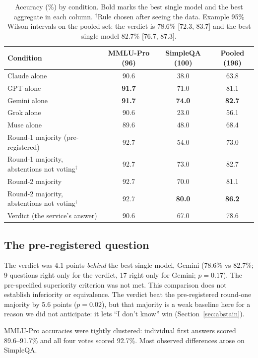 \documentclass[11pt]{article}
\begin{document}
\begin{table}[t]
\centering
\begin{tabular}{lccc}
\toprule
Condition & MMLU-Pro (96) & SimpleQA (100) & Pooled (196) \\
\midrule
Claude alone & 90.6 & 38.0 & 63.8 \\
GPT alone & \textbf{91.7} & 71.0 & 81.1 \\
Gemini alone & \textbf{91.7} & \textbf{74.0} & \textbf{82.7} \\
Grok alone & 90.6 & 23.0 & 56.1 \\
Muse alone & 89.6 & 48.0 & 68.4 \\
\midrule
Round-1 majority (pre-registered) & 92.7 & 54.0 & 73.0 \\
Round-1 majority, abstentions not voting$^\dagger$ & 92.7 & 73.0 & 82.7 \\
Round-2 majority & 92.7 & 70.0 & 81.1 \\
Round-2 majority, abstentions not voting$^\dagger$ & 92.7 & \textbf{80.0} & \textbf{86.2} \\
\midrule
Verdict (the service's answer) & 90.6 & 67.0 & 78.6 \\
\bottomrule
\end{tabular}
\caption{Accuracy (\%) by condition. Bold marks the best single model and the best aggregate in each column. $^\dagger$Rule chosen after seeing the data. Example 95\% Wilson intervals on the pooled set: the verdict is 78.6\% [72.3, 83.7] and the best single model 82.7\% [76.7, 87.3].}
\label{tab:main}
\end{table}

\subsection{The pre-registered question}
\label{sec:prereg}
The verdict was 4.1 points \emph{behind} the best single model, Gemini (78.6\% vs 82.7\%; 9 questions right only for the verdict, 17 right only for Gemini; $p=0.17$). The pre-specified superiority criterion was not met. This comparison does not establish inferiority or equivalence. The verdict beat the pre-registered round-one majority by 5.6 points ($p=0.02$), but that majority is a weak baseline here for a reason we did not anticipate: it lets ``I don't know'' win (Section~\ref{sec:abstain}).

MMLU-Pro accuracies were tightly clustered: individual first answers scored 89.6--91.7\% and all four votes scored 92.7\%. Most observed differences arose on SimpleQA.
\end{document}
